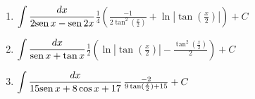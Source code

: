 {\begin{enumerate}
\item {$\displaystyle\int \frac{dx}{2\text{\rm sen}\, x-\text{\rm sen}\, 2x}$}{$\frac{1}{4}\left( \frac{-1}{2\tan ^{2}(\frac{x}{2})}+\ln \left\vert \tan (
	\frac{x}{2})\right\vert \right) +C$}
	
\item {$\displaystyle\int \frac{dx}{\text{\rm sen}\, x+\tan x}$}{$\frac{1}{2}\left( \ln \left\vert \tan (\frac{x}{2})\right\vert -\frac{\tan
^{2}(\frac{x}{2})}{2}\right) +C$}

\item {$\displaystyle\int \frac{dx}{15\text{\rm sen}\, x+8\cos x+17}$}{$\linebreak\frac{-2}{9\tan (\frac{x}{2})+15}+C$}
\end{enumerate}
}


